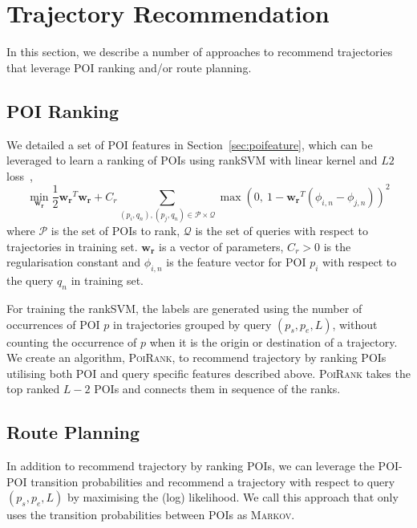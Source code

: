 \section{Trajectory Recommendation}
\label{sec:recommendation}

In this section, we describe a number of approaches to recommend trajectories that leverage POI ranking and/or route planning.

\subsection{POI Ranking}
\label{sec:ranksvm}

We detailed a set of POI features in Section~\ref{sec:poifeature}, 
which can be leveraged to learn a ranking of POIs using rankSVM with linear kernel and $L2$ loss~\cite{lranksvm},
\begin{equation*}
\min_{\mathbf{w_r}} \frac{1}{2} \mathbf{w_r}^T \mathbf{w_r} + 
                    C_r \sum_{(p_i, q_n), (p_j, q_n) \in \mathcal{P} \times \mathcal{Q}}
                    \max \left( 0,~ 1 - \mathbf{w_r}^T (\phi_{i,n} - \phi_{j,n}) \right)^2
\end{equation*}
where $\mathcal{P}$ is the set of POIs to rank,
$\mathcal{Q}$ is the set of queries with respect to trajectories in training set.
$\mathbf{w_r}$ is a vector of parameters,
$C_r > 0$ is the regularisation constant and
$\phi_{i,n}$ is the feature vector for POI $p_i$ with respect to the query $q_n$ in training set.

For training the rankSVM, the labels are generated using the number of occurrences of
POI $p$ in trajectories grouped by query $(p_s, p_e, L)$,
without counting the occurrence of $p$ when it is the origin or destination of a trajectory.
We create an algorithm, \textsc{PoiRank}, to recommend trajectory by ranking POIs 
utilising both POI and query specific features described above. 
\textsc{PoiRank} takes the top ranked $L-2$ POIs and connects them in sequence of the ranks.



\subsection{Route Planning}
\label{sec:markov}

In addition to recommend trajectory by ranking POIs, we can leverage the POI-POI transition probabilities and 
recommend a trajectory with respect to query $(p_s, p_e, L)$ by maximising the (log) likelihood. 
We call this approach that only uses the transition probabilities between POIs as \textsc{Markov}.

